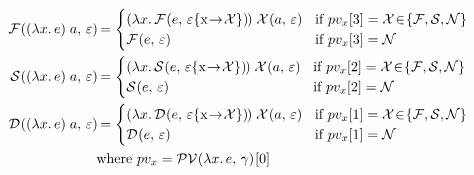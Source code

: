 \documentclass[../main.tex]{subfiles}
\begin{document}
\begin{align*}
    \reduce{F}{\applyexpr{x}{e}{a}} &= \begin{cases}
            \applyexpr{x}{\reduce[\envmap{\varepsilon}{x}{\X}]{F}{e}}{\reduce{X}{a}}
                &\text{if } pv_x[3] = \X\hspace{-2pt} \in\hspace{-2pt} \{ \F,\S,\N \} \\
            \reduce{F}{e}
                &\text{if } pv_x[3] = \N
        \end{cases} \\
    \reduce{S}{\applyexpr{x}{e}{a}} &= \begin{cases}
            \applyexpr{x}{\reduce[\envmap{\varepsilon}{x}{\X}]{S}{e}}{\reduce{X}{a}}
                &\text{if } pv_x[2] = \X\hspace{-2pt} \in\hspace{-2pt} \{ \F,\S,\N \} \\
            \reduce{S}{e}
                &\text{if } pv_x[2] = \N
        \end{cases} \\
    \reduce{D}{\applyexpr{x}{e}{a}} &= \begin{cases}
            \applyexpr{x}{\reduce[\envmap{\varepsilon}{x}{\X}]{D}{e}}{\reduce{X}{a}}
                &\text{if } pv_x[1] = \X\hspace{-2pt} \in\hspace{-2pt} \{ \F,\S,\N \} \\
            \reduce{D}{e}
                &\text{if } pv_x[1] = \N
        \end{cases} \\
        &\text{where } pv_x = \pv{\lambdaexpr{x}{e}}[0]
\end{align*}
\end{document}

